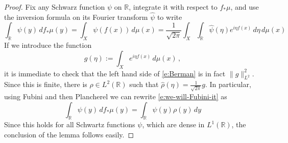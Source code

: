 \documentclass[11pt,reqno]{amsart}
\newcommand{\R}{\mathbb R}
\theoremstyle{definition}
\numberwithin{equation}{section}
\begin{document}
\begin{proof}
Fix any Schwarz function $\psi$ on $\R$, integrate it with respect to $f_*\mu$, and use the inversion formula on its Fourier transform $\hat\psi$ to write
\begin{equation}\label{e:we-will-Fubini-it}
\int_\R \psi(y)\,df_*\mu(y)=\int_X\psi(f(x))\,d\mu(x)=\frac{1}{\sqrt{2\pi}}\int_X \int_{\R}\hat{\psi}(\eta)e^{i\eta f(x)}\,d\eta\,d\mu(x)
\end{equation}
If we introduce the function 
\[
g (\eta) := \int_X e^{i\eta f(x)}\,d\mu(x)\, ,
\]
it is immediate to check that the left hand side of \eqref{e:Berman} is in fact $\|g\|_{L^2}^2$. Since this is finite, there is $\rho \in L^2(\R)$ such that $\hat{\rho}(\eta)= \frac{1}{\sqrt{2\pi}}g$. In particular, using Fubini and then Plancherel we can rewrite \eqref{e:we-will-Fubini-it} as 
\[
\int_\R \psi(y)\,df_*\mu(y)=\int_\R\psi(y)\rho(y)\,dy
\]
Since this holds for all Schwartz functions $\psi$, which are dense in $L^1 (\mathbb R)$, the conclusion of the lemma follows easily.
\end{proof}
\end{document}
